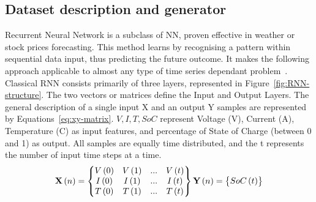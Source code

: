 \subsection{Dataset description and generator} \label{subsec:dataset}
Recurrent Neural Network is a subclass of NN, proven effective in weather or stock prices forecasting.
This method learns by recognising a pattern within sequential data input, thus predicting the future outcome.
It makes the following approach applicable to almost any type of time series dependant problem~\cite{anton_battery_2013}.
Classical RNN consists primarily of three layers, represented in Figure~\ref{fig:RNN-structure}.
The two vectors or matrices define the Input and Output Layers.
The general description of a single input X and an output Y samples are represented by Equations~\ref{eq:xy-matrix}.
$V, I, T, SoC$ represent Voltage (V), Current (A), Temperature (\textdegree{}C) as input features, and percentage of State of Charge (between 0 and 1) as output.
All samples are equally time distributed, and the t represents the number of input time steps at a time.
\begin{equation}
    \textbf{X} \left (n  \right ) = 
    \begin{Bmatrix}
        V \left (0  \right ) & V \left (1  \right ) & ... & V \left (t  \right )\\ 
        I \left (0  \right ) & I \left (1  \right ) & ... & I \left (t  \right )\\ 
        T \left (0  \right ) & T \left (1  \right ) & ... & T \left (t  \right )\\
    \end{Bmatrix}
    \\ \textbf{Y} \left (n  \right ) = 
    \begin{Bmatrix}
        SoC \left (t  \right ) 
    \end{Bmatrix}
\label{eq:xy-matrix}
\end{equation}

